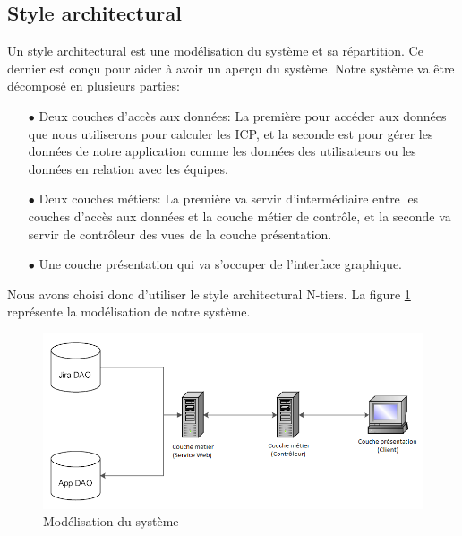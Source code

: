 \subsection{Style architectural}
Un style architectural est une modélisation du système et sa répartition. Ce dernier est conçu pour aider à avoir un aperçu du système.
Notre système va être décomposé en plusieurs parties:\\
\begin{itemize}
    \item[$\bullet$] Deux couches d'accès aux données: La première pour accéder aux données que nous utiliserons pour calculer les ICP, et la seconde est pour gérer les données de notre application comme les données des utilisateurs ou les données en relation avec les équipes.
    \item[$\bullet$] Deux couches métiers: La première va servir d'intermédiaire entre les couches d'accès aux données et la couche métier de contrôle, et la seconde va servir de contrôleur des vues de la couche présentation.
    \item[$\bullet$] Une couche présentation qui va s'occuper de l'interface graphique.\\
\end{itemize}
Nous avons choisi donc d'utiliser le style architectural N-tiers. La figure \ref{code54} représente la modélisation de notre système.
\begin{figure}[H]
  \centering
  \includegraphics[scale=0.8]{figures/style_architecture.png}
  \caption{Modélisation du système}
  \label{code54}
\end{figure}
